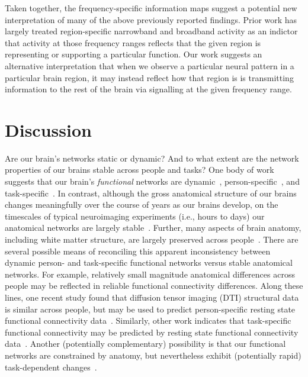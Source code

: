 \documentclass[11pt]{article}
\begin{document}
Taken together, the frequency-specific information maps suggest a potential new
interpretation of many of the above previously reported findings.  Prior work
has largely treated region-specific narrowband and broadband activity as an
indictor that activity at those frequency ranges reflects that the given region
is representing or supporting a particular function.  Our work suggests an
alternative interpretation that when we observe a particular neural pattern in a
particular brain region, it may instead reflect how that region is is
transmitting information to the rest of the brain via signalling at the given
frequency range.

\section*{Discussion}
Are our brain's networks static or dynamic?  And to what
extent are the network properties of our brains stable across people and tasks?
One body of work suggests that our brain's \textit{functional} networks are
dynamic~\citep[e.g., ][]{MannEtal18, OwenEtal19}, person-specific~\citep[e.g.,
][]{FinnEtal15}, and task-specific~\citep[e.g., ][]{Turk13}.  In contrast,
although the gross anatomical structure of our brains changes meaningfully over
the course of years as our brains develop, on the timescales of typical
neuroimaging experiments (i.e., hours to days) our anatomical networks are
largely stable~\citep[e.g., ][]{CaseEtal00}.  Further, many aspects of brain
anatomy, including white matter structure, are largely preserved across
people~\citep[e.g., ][]{TalaTour88, JahaEtal13, MoriEtal08}. There are several
possible means of reconciling this apparent inconsistency between dynamic
person- and task-specific functional networks versus stable anatomical networks.
For example, relatively small magnitude anatomical differences across people may
be reflected in reliable functional connectivity differences.  Along these
lines, one recent study found that diffusion tensor imaging (DTI) structural
data is similar across people, but may be used to predict person-specific
resting state functional connectivity data~\citep{BeckEtal18}.  Similarly, other
work indicates that task-specific functional connectivity may be predicted by
resting state functional connectivity data~\citep{ColeEtal16, TavoEtal16}.
Another (potentially complementary) possibility is that our functional networks
are constrained by anatomy, but nevertheless exhibit (potentially rapid)
task-dependent changes~\citep[e.g., ][]{SporBetz16}.
\end{document}
